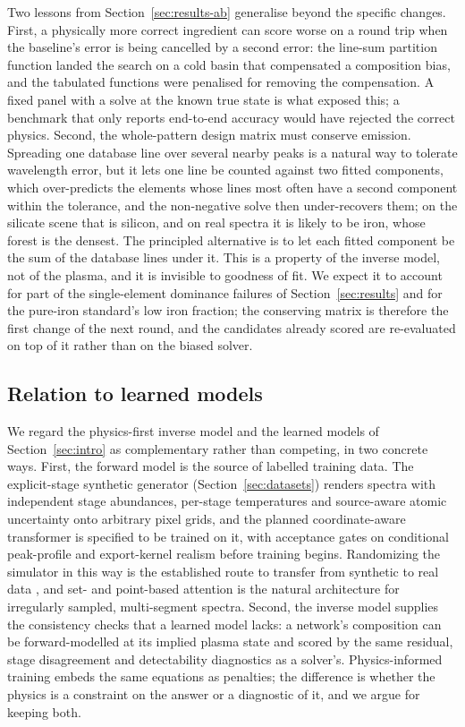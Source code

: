 Two lessons from Section~\ref{sec:results-ab} generalise beyond the specific changes. First, a
physically more correct ingredient can score worse on a round trip when the baseline's error is
being cancelled by a second error: the line-sum partition function landed the search on a cold
basin that compensated a composition bias, and the tabulated functions were penalised for
removing the compensation. A fixed panel with a solve at the known true state is what exposed
this; a benchmark that only reports end-to-end accuracy would have rejected the correct physics.
Second, the whole-pattern design matrix must conserve emission. Spreading one database line over
several nearby peaks is a natural way to tolerate wavelength error, but it lets one line be
counted against two fitted components, which over-predicts the elements whose lines most often
have a second component within the tolerance, and the non-negative solve then under-recovers
them; on the silicate scene that is silicon, and on real spectra it is likely to be iron, whose
forest is the densest. The principled alternative is to let each fitted component be the sum of
the database lines under it. This is a property of the inverse model, not of the plasma, and
it is invisible to goodness of fit. We expect it to account for part of the single-element
dominance failures of Section~\ref{sec:results} and for the pure-iron standard's low iron
fraction; the conserving matrix is therefore the first change of the next round, and the
candidates already scored are re-evaluated on top of it rather than on the biased solver.

\subsection{Relation to learned models}

We regard the physics-first inverse model and the learned models of
Section~\ref{sec:intro} as complementary rather than competing, in two concrete
ways. First, the forward model is the source of labelled training data. The
explicit-stage synthetic generator (Section~\ref{sec:datasets}) renders spectra with
independent stage abundances, per-stage temperatures and source-aware atomic
uncertainty onto arbitrary pixel grids, and the planned coordinate-aware transformer
is specified to be trained on it, with acceptance gates on conditional peak-profile
and export-kernel realism before training begins. Randomizing the simulator in this
way is the established route to transfer from synthetic to real data
\citep{tobin2017domainrand}, and set- and point-based attention
\citep{lee2019settransformer,zaheer2017deepsets} is the natural architecture for
irregularly sampled, multi-segment spectra. Second, the inverse model supplies the
consistency checks that a learned model lacks: a network's composition can be
forward-modelled at its implied plasma state and scored by the same residual, stage
disagreement and detectability diagnostics as a solver's. Physics-informed training
\citep{raissi2019pinn} embeds the same equations as penalties; the difference is
whether the physics is a constraint on the answer or a diagnostic of it, and we
argue for keeping both.

